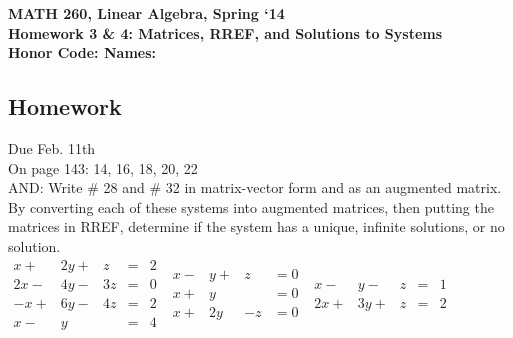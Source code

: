 \documentclass{article}
\begin{document}
\begin{flushleft}
	\bfseries{MATH 260, Linear Algebra, Spring `14}\\
	\bfseries{Homework 3 \& 4:  Matrices, RREF, and Solutions to Systems}\\
	\bfseries{Honor Code:} \hspace{3.5in}\bfseries{Names:}\\
\end{flushleft}
\begin{flushleft}
\vspace{.5in}

\section{Homework}
\LARGE Due Feb. 11th \\
\normalsize
\vspace{0.25in}
On page 143: 14, 16, 18, 20, 22\\
AND: Write \# 28 and \# 32 in matrix-vector form and as an augmented matrix.\\
\vspace{0.25in}
By converting each of these systems into augmented matrices, then putting the matrices in RREF, determine if the system has a unique, infinite solutions, or no solution.\\
$\begin{array}{ccccc}
x+&2y+& z& = &2\\
2x-&4y-&3z& = &0\\
-x+&6y-&4z& = &2\\
x-&y& & = &4
\end{array}
$
\hspace{0.35in}
$\begin{array}{ccccc}
x-& y+ & z &= 0\\
x+&y& & = 0\\
x+ & 2y & -z & = 0
\end{array}$
\hspace{0.35in}
$\begin{array}{ccccc}
x- & y- & z & = & 1\\
2x+& 3y+ & z & = &2
\end{array}$
\end{flushleft}
\end{document}
